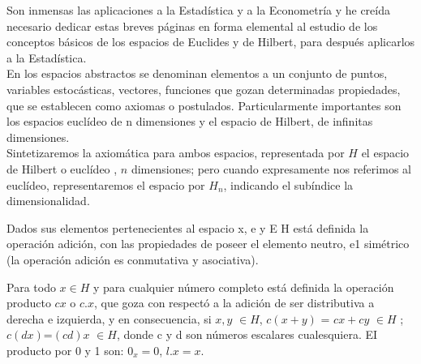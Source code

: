 Son inmensas las aplicaciones a la Estadística y a la Econometría y he creída
necesario dedicar estas breves páginas en forma elemental al estudio de los conceptos
básicos de los espacios de Euclides y de Hilbert, para después aplicarlos a la Estadística.\\

En los espacios abstractos se denominan elementos a un conjunto de puntos,
variables estocásticas, vectores, funciones que gozan determinadas propiedades, que
se establecen como axiomas o postulados. Particularmente importantes son los espacios
euclídeo de n dimensiones y el espacio de Hilbert, de infinitas dimensiones. \\

Sintetizaremos la axiomática para ambos espacios, representada por $H$ el espacio
de Hilbert o euclídeo , $n$ dimensiones; pero cuando expresamente nos referimos al
euclídeo, representaremos el espacio por $H_{n}$, indicando el subíndice la dimensionalidad.\\

\begin{axi}
	Dados sus elementos pertenecientes al espacio x, e y E H está definida la operación adición, con las propiedades de poseer el elemento neutro, e1 simétrico (la operación adición es conmutativa y asociativa).
\end{axi}


\begin{axi}
	Para todo $x \in  H$ y para cualquier número completo está definida la operación
	producto $cx$ o $c.x$, que goza con respectó a la adición de ser distributiva a derecha e
	izquierda, y en consecuencia, si $x, y$  $\in{H}$, $c(x + y)$ = $cx + cy$ $\in{H}$ ; $c(dx)$=$(cd)x$  $\in H$, donde c y d son números escalares cualesquiera. EI producto por 0 y 1 son: $0_{x} = 0$,
	$l . x = x$.
\end{axi}

